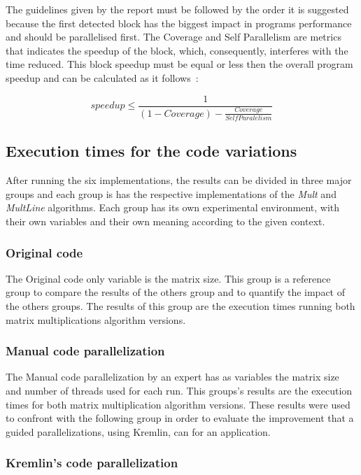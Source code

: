 The guidelines given by the report must be followed by the order it is suggested because the first detected block has the biggest impact in programs performance and should be parallelised first. The Coverage and Self Parallelism are metrics that indicates the speedup of the block, which, consequently, interferes with the time reduced. This block speedup must be equal or less then the overall program speedup and can be calculated as it follows~\cite{Saturnino}:

\begin{equation}
speedup \leq \frac{1}{(1- Coverage) - \frac{Coverage}{Self Paralelism}}
\end{equation}

\subsection{Execution times for the code variations}

After running the six implementations, the results can be divided in three major groups and each group is has the respective implementations of the \textit{Mult} and \textit{MultLine} algorithms. Each group has its own experimental environment,  with their own variables and their own meaning according to the given context.

\subsubsection{Original code}

The Original code only variable is the matrix size. This group is  a reference group to compare the results of the others group and to quantify the impact of the others groups. The results of this group are the execution times running both matrix multiplications algorithm versions.

\subsubsection{Manual code parallelization}

The Manual code parallelization by an expert has as variables the matrix size and number of threads used for each run. This groups's results are the execution times for both matrix multiplication algorithm versions. These results were used to confront with the following group in order to evaluate the improvement that a guided parallelizations, using Kremlin, can for an application.

\subsubsection{Kremlin's code parallelization}

